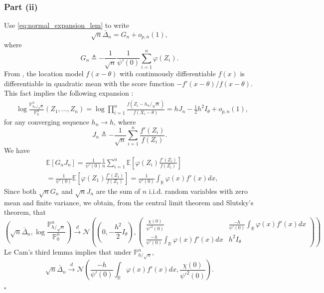 \documentclass[letterpaper, 11pt]{IEEEtran}      %
\newcommand{\ex}[1]{\ensuremath{\mathbb{E}\left[ #1\right]}}
\newcommand{\Prob}{\mathbb{P} }
\newcommand*{\QEDA}{\hfill\ensuremath{\square}}
\newcommand{\Ncal}{\mathcal{N}}
\begin{document}
{\subsubsection*{Part (ii)}
Use \eqref{eq:normal_expansion_lem} to write
\[
\sqrt{n} \bar{\Delta}_n = G_n + o_{p,n}(1),
\]
where
\[
G_n \triangleq -\frac{1}{\sqrt{n}} \frac{1}{\psi'(0)} \sum_{i=1}^{n} \varphi(Z_i). 
\]
From \cite[Exm. 7.8]{van2000asymptotic}, the location model $f(x-\theta)$ with continuously differentiable $f(x)$ is differentiable in quadratic mean with the score function $-f'(x-\theta)/f(x-\theta)$. This fact implies the following expansion \cite[Thm. 7.2]{van2000asymptotic}:
\begin{align}
\label{eq:PJ_LAN}
& \log \frac{\Prob^n_{h_n/\sqrt{n}}}{\Prob^n_0} (Z_1,\ldots,Z_n) =  \log \prod_{i=1}^{n} \frac{f(Z_i-h_n/\sqrt{n})}  {f(X_i-\theta)} = h J_n - \frac{1}{2}h^2 I_{\theta} + o_{p,n}(1),
\end{align}
for any converging sequence $h_n \to h$, 
where 
\[
J_n \triangleq -\frac{1}{\sqrt{n}} \sum_{i=1}^n \frac{f'(Z_i)}{f(Z_i)} .
\]
We have
\begin{align*}
& \ex{ G_n J_n} = \frac{1}{\psi'(0)}\frac{1}{n} \sum_{i=1}^n \ex{ \varphi(Z_i) \frac{f'(Z_i)}{f(Z_i)} }  \\
& = \frac{1}{ \psi'(0)} \ex{ \varphi(Z_1) \frac{f'(Z_1)}{f(Z_1)}} =  \frac{1}{ \psi'(0)} \int_{\mathbb R} \varphi(x) f'(x) dx , 
\end{align*}
Since both $\sqrt{n}G_n$ and $\sqrt{n}J_n$ are the sum of $n$ i.i.d. random variables with zero mean and finite variance, we obtain, from the central limit theorem and Slutsky's theorem, that
\[
\left(\sqrt{n} \bar{\Delta}_n, \log \frac{\Prob^n_{h/\sqrt{n}}}{\Prob^n_0} \right) \overset{d}{\to} \Ncal \left( \left(0,-\frac{h^2}{2} I_\theta \right),  \begin{pmatrix}
\frac{\chi(0)}{\psi'^2(0)} & \frac{-h}{ \psi'(0)} \int_{\mathbb R} \varphi(x) f'(x) dx \\
\frac{-h}{ \psi'(0)} \int_{\mathbb R} \varphi(x) f'(x) dx & h^2 I_\theta 
\end{pmatrix}  \right)
\]
Le Cam's third lemma \cite[Exm. 6.7]{van2000asymptotic} implies that under $\Prob^n_{h/\sqrt{n}}$, 
\[
\sqrt{n}\bar{\Delta}_n \overset{d}{\to} \Ncal\left(\frac{-h}{ \psi'(0)} \int_{\mathbb R} \varphi(x) f'(x) dx,  \frac{\chi(0)}{\psi'^2(0)} \right).
\]

\QEDA
}
\end{document}
